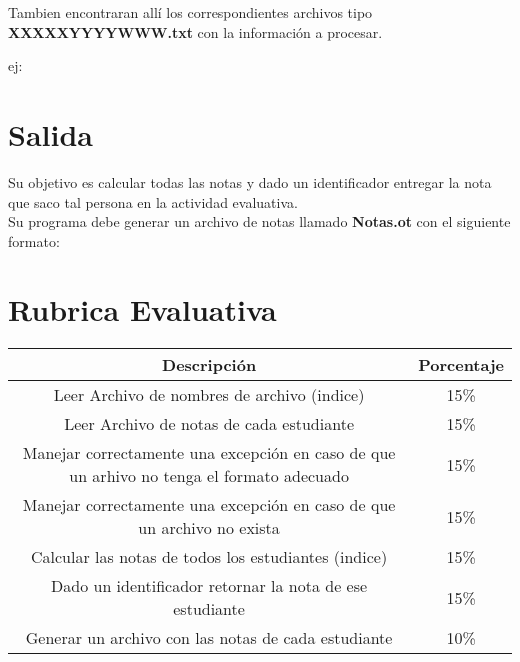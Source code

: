 Tambien encontraran allí los correspondientes archivos tipo \textbf{XXXXXYYYYWWW.txt} con la información a procesar.

ej:\\



\newpage

\section{Salida}
        
Su objetivo es calcular todas las notas y dado un identificador entregar la nota que saco tal persona en la actividad evaluativa.\\

Su programa debe generar un archivo de notas llamado \textbf{Notas.ot} con el siguiente formato:




\newpage

\section{Rubrica Evaluativa}


\begin{tabular}{|c|c|}
  \hline
  \textbf{Descripción} & \textbf{Porcentaje}\\
  \hline
  Leer Archivo de nombres de archivo (indice) & 15\%\\
  \hline
  Leer Archivo de notas de cada estudiante  & 15\%\\
  \hline
  Manejar correctamente una excepción en caso de que un arhivo no tenga el formato adecuado & 15\% \\
  \hline
  Manejar correctamente una excepción en caso de que un archivo no exista & 15\%\\
  \hline
  Calcular las notas de todos los estudiantes (indice) & 15\%\\
  \hline
  Dado un identificador retornar la nota de ese estudiante & 15\%\\
  \hline
  Generar un archivo con las notas de cada estudiante & 10\%\\
  \hline
\end{tabular}

